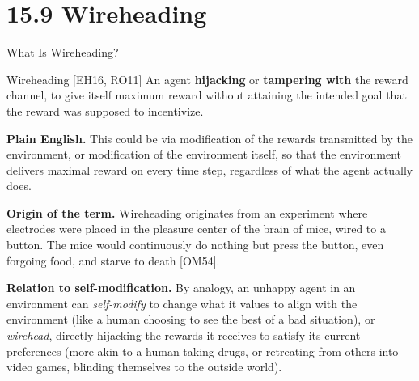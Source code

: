 \documentclass[aspectratio=169,10pt]{beamer}
\begin{document}
\section{15.9 Wireheading}

\begin{frame}{What Is Wireheading?}
  \begin{block}{Wireheading [EH16, RO11]}
    An agent \textbf{hijacking} or \textbf{tampering with} the reward
    channel, to give itself maximum reward without attaining the intended
    goal that the reward was supposed to incentivize.
  \end{block}

  \textbf{Plain English.} This could be via modification of the rewards
  transmitted by the environment, or modification of the environment
  itself, so that the environment delivers maximal reward on every time
  step, regardless of what the agent actually does.

  \vspace{0.4em}
  \textbf{Origin of the term.} Wireheading originates from an experiment
  where electrodes were placed in the pleasure center of the brain of
  mice, wired to a button. The mice would continuously do nothing but
  press the button, even forgoing food, and starve to death [OM54].

  \vspace{0.4em}
  \textbf{Relation to self-modification.} By analogy, an unhappy agent in
  an environment can \emph{self-modify} to change what it values to align
  with the environment (like a human choosing to see the best of a bad
  situation), or \emph{wirehead}, directly hijacking the rewards it
  receives to satisfy its current preferences (more akin to a human
  taking drugs, or retreating from others into video games, blinding
  themselves to the outside world).
\end{frame}
\end{document}
